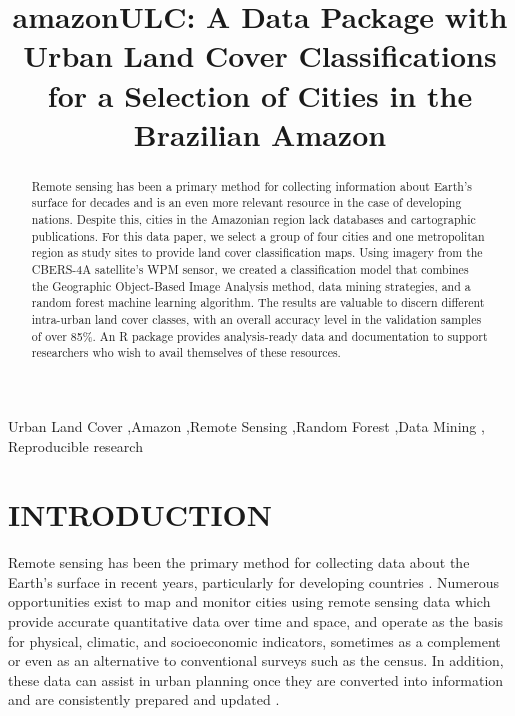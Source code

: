 \documentclass[preprint, 3p,
authoryear]{elsarticle} %
\begin{document}
\begin{frontmatter}

  \title{amazonULC: A Data Package with Urban Land Cover Classifications
for a Selection of Cities in the Brazilian Amazon}
  
  \begin{abstract}
  Remote sensing has been a primary method for collecting information
  about Earth's surface for decades and is an even more relevant
  resource in the case of developing nations. Despite this, cities in
  the Amazonian region lack databases and cartographic publications. For
  this data paper, we select a group of four cities and one metropolitan
  region as study sites to provide land cover classification maps. Using
  imagery from the CBERS-4A satellite's WPM sensor, we created a
  classification model that combines the Geographic Object-Based Image
  Analysis method, data mining strategies, and a random forest machine
  learning algorithm. The results are valuable to discern different
  intra-urban land cover classes, with an overall accuracy level in the
  validation samples of over 85\%. An R package provides analysis-ready
  data and documentation to support researchers who wish to avail
  themselves of these resources.
  \end{abstract}
    \begin{keyword}
    Urban Land Cover \sep Amazon \sep Remote Sensing \sep Random
Forest \sep Data Mining \sep 
    Reproducible research
  \end{keyword}
  
 \end{frontmatter}

\hypertarget{introduction}{%
\section{INTRODUCTION}\label{introduction}}

Remote sensing has been the primary method for collecting data about the
Earth's surface in recent years, particularly for developing countries
\citep{Zhu2022}. Numerous opportunities exist to map and monitor cities
using remote sensing data which provide accurate quantitative data over
time and space, and operate as the basis for physical, climatic, and
socioeconomic indicators, sometimes as a complement or even as an
alternative to conventional surveys such as the census. In addition,
these data can assist in urban planning once they are converted into
information and are consistently prepared and updated \citep{Weng2018}.
\end{document}
